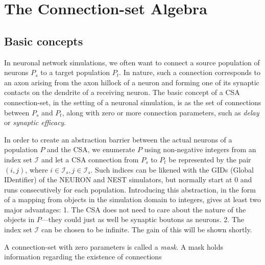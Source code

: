 \documentclass{frontiersSCNS} %
\begin{document}

\section{The Connection-set Algebra}\label{sec:csa}

\subsection{Basic concepts}

In neuronal network simulations, we often want to connect a source
population of neurons $P_s$ to a target population $P_t$.  In nature,
such a connection corresponds to an axon arising from the axon hillock
of a neuron and forming one of its synaptic contacts on the dendrite
of a receiving neuron.  The basic concept of a CSA connection-set, in
the setting of a neuronal simulation, is as the set of connections
between $P_s$ and $P_t$, along with zero or more connection
parameters, such as \emph{delay} or \emph{synaptic efficacy}.

In order to create an abstraction barrier between the actual neurons
of a population $P$ and the CSA, we enumerate $P$ using non-negative
integers from an index set $\mathcal{I}$ and let a CSA connection from
$P_s$ to $P_t$ be represented by the pair $(i, j)$, where $i \in
\mathcal{I}_s, j \in \mathcal{I}_s$.  Such indices can be likened with
the GIDs (Global IDentifier) of the NEURON and NEST simulators, but
normally start at 0 and runs consecutively for each population.
Introducing this abstraction, in the form of a mapping from objects in
the simulation domain to integers, gives at least two major
advantages: 1. The CSA does not need to care about the nature of the
objects in $P$---they could just as well be synaptic boutons as neurons.
2. The index set $\mathcal{I}$ can be chosen to be infinite.  The
gain of this will be shown shortly.

A connection-set with zero parameters is called a \emph{mask}. A mask
holds information regarding the existence of connections

\end{document}

